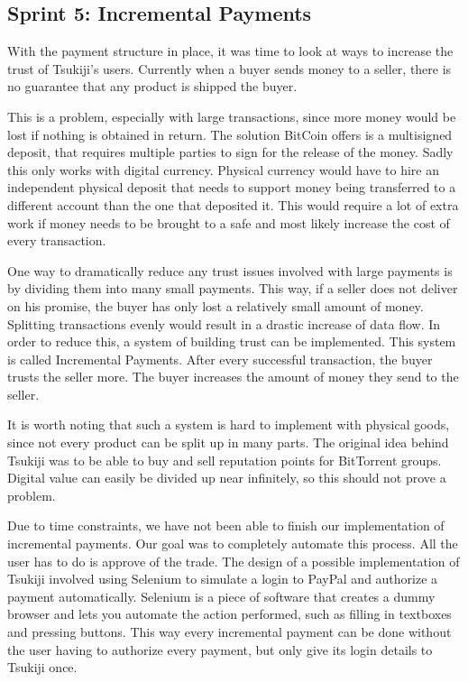 \subsection{Sprint 5: Incremental Payments}
\label{incpay}
With the payment structure in place, it was time to look at ways to increase the trust of Tsukiji's users.
Currently when a buyer sends money to a seller, there is no guarantee that any product is shipped the buyer.

This is a problem, especially with large transactions, since more money would be lost if nothing is obtained in return.
The solution BitCoin offers is a multisigned deposit, that requires multiple parties to sign for the release of the money.
Sadly this only works with digital currency.
Physical currency would have to hire an independent physical deposit that needs to support money being transferred to a different account than the one that deposited it.
This would require a lot of extra work if money needs to be brought to a safe and most likely increase the cost of every transaction.

One way to dramatically reduce any trust issues involved with large payments is by dividing them into many small payments.
This way, if a seller does not deliver on his promise, the buyer has only lost a relatively small amount of money.
Splitting transactions evenly would result in a drastic increase of data flow. 
In order to reduce this, a system of building trust can be implemented.
This system is called Incremental Payments.
After every successful transaction, the buyer trusts the seller more.
The buyer increases the amount of money they send to the seller.

It is worth noting that such a system is hard to implement with physical goods, since not every product can be split up in many parts.
The original idea behind Tsukiji was to be able to buy and sell reputation points for BitTorrent groups.
Digital value can easily be divided up near infinitely, so this should not prove a problem.

Due to time constraints, we have not been able to finish our implementation of incremental payments.
Our goal was to completely automate this process.
All the user has to do is approve of the trade.
The design of a possible implementation of Tsukiji involved using Selenium to simulate a login to PayPal and authorize a payment automatically.
Selenium \cite{selenium} is a piece of software that creates a dummy browser and lets you automate the action performed, such as filling in textboxes and pressing buttons.
This way every incremental payment can be done without the user having to authorize every payment, but only give its login details to Tsukiji once.
 
